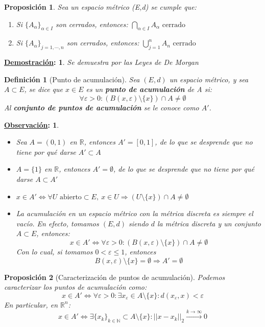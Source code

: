 \documentclass[10pt,a4paper,openright]{book}
\theoremstyle{break}
\newtheorem*{defi}{Definición}
\newtheorem*{prop}{Proposición}
\newtheorem*{demo}{\underline{Demostración}:}
\newtheorem*{obs}{\underline{Observación}:}
\begin{document}
\begin{prop}
Sea un espacio métrico (E,d) se cumple que:
\begin{enumerate}
\item Si $\{A_\alpha\}_{\alpha \in I}$ son cerrados, entonces: $\bigcap_{\alpha \in I} A_{\alpha} \mbox{ cerrado}$
\item Si $\{A_\alpha\}_{j = 1, \cdots, n}$ son cerrados, entonces: $\bigcup_{j = 1}^{n} A_{n} \mbox{ cerrado}$
\end{enumerate}
\end{prop}
\begin{demo}
Se demuestra por las Leyes de De Morgan
\end{demo}

\begin{defi}[Punto de acumulación]
Sea $(E,d)$ un espacio métrico, y sea $A \subset E$, se dice que $x \in E$ es un \textbf{punto de acumulación} de A si:
$$\forall \varepsilon > 0: \left(B(x,\varepsilon)\setminus\{x\}\right)\cap A \neq \emptyset$$
 Al \textbf{conjunto de puntos de acumulación} se le conoce como $A'$.
\end{defi}

\begin{obs}
\begin{itemize}
\item Sea $A=(0,1)$ en $\mathbb{R}$, entonces $A'=[0,1]$, de lo que se desprende que no tiene por qué darse $A'\subset A$
\item $A = \{1\}$ en $\mathbb{R}$, entonces $A' = \emptyset$, de lo que se desprende que no tiene por qué darse $A\subset A'$
\item $x\in A' \Leftrightarrow \forall U \mbox{ abierto} \subset E, \ x\in U \Rightarrow \left( U\setminus\{x\}\right) \cap A \neq \emptyset$
\item La acumulación en un espacio métrico con la métrica discreta es siempre el vacío. En efecto, tomamos $(E,d)$ siendo $d$ la métrica discreta y un conjunto $A\subset E$, entonces:
$$x\in A' \Leftrightarrow \forall \varepsilon > 0: \left( B(x,\varepsilon) \setminus\{x\}\right) \cap A \neq \emptyset$$
Con lo cual, si tomamos $0 < \varepsilon \leq 1$, entonces
$$B(x,\varepsilon)\setminus\{x\} =\emptyset \Rightarrow A' = \emptyset$$
\end{itemize}
\end{obs}

\begin{prop}[Caracterización de puntos de acumulación]
Podemos caracterizar los puntos de acumulación como:
$$x\in A' \Leftrightarrow \forall \varepsilon > 0: \exists x_{\varepsilon} \in A\setminus\{x\}: d(x_\varepsilon, x)< \varepsilon$$
En particular, en $\mathbb{R}^{n}$:
$$x\in A' \Leftrightarrow \exists \{x_k\}_{k\in \mathbb N}\subset A\setminus\{x\}: ||x-x_k||_{2}\xrightarrow{k\rightarrow\infty} 0$$
\end{prop}
\end{document}
